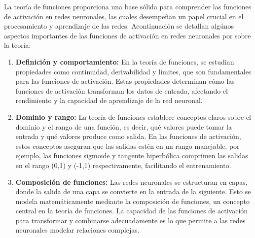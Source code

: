 \documentclass[11pt, a4paper]{article}
\begin{document}
La teoría de funciones proporciona una base sólida para comprender las funciones de activación en redes neuronales, las cuales desempeñan un papel crucial en el procesamiento y aprendizaje de las redes. Acontinuación se detallan algúnos aspectos importantes de las funciones de activación en redes neuronales por sobre la teoría:

\begin{enumerate}
  \item \textbf{Definición y comportamiento:} En la teoría de funciones, se estudian propiedades como continuidad, derivabilidad y límites, que son fundamentales para las funciones de activación. Estas propiedades determinan cómo las funciones de activación transforman los datos de entrada, afectando el rendimiento y la capacidad de aprendizaje de la red neuronal.
  
  \item \textbf{Dominio y rango:} La teoría de funciones establece conceptos claros sobre el dominio y el rango de una función, es decir, qué valores puede tomar la entrada y qué valores produce como salida. En las funciones de activación, estos conceptos aseguran que las salidas estén en un rango manejable, por ejemplo, las funciones sigmoide y tangente hiperbólica comprimen las salidas en el rango (0,1) y (-1,1) respectivamente, facilitando el entrenamiento.
  
  \item \textbf{Composición de funciones:} Las redes neuronales se estructuran en capas, donde la salida de una capa se convierte en la entrada de la siguiente. Esto se modela matemáticamente mediante la composición de funciones, un concepto central en la teoría de funciones. La capacidad de las funciones de activación para transformar y combinarse adecuadamente es lo que permite a las redes neuronales modelar relaciones complejas.
  
\end{enumerate}
\end{document}
